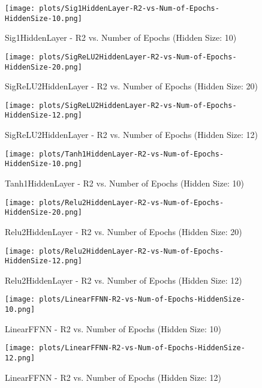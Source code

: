 \begin{figure}[H]
    \centering
    \texttt{[image: plots/Sig1HiddenLayer-R2-vs-Num-of-Epochs-HiddenSize-10.png]}
    \caption{Sig1HiddenLayer - R2 vs. Number of Epochs (Hidden Size: 10)}
\end{figure}

\begin{figure}[H]
    \centering
    \texttt{[image: plots/SigReLU2HiddenLayer-R2-vs-Num-of-Epochs-HiddenSize-20.png]}
    \caption{SigReLU2HiddenLayer - R2 vs. Number of Epochs (Hidden Size: 20)}
\end{figure}

\begin{figure}[H]
    \centering
    \texttt{[image: plots/SigReLU2HiddenLayer-R2-vs-Num-of-Epochs-HiddenSize-12.png]}
    \caption{SigReLU2HiddenLayer - R2 vs. Number of Epochs (Hidden Size: 12)}
\end{figure}

\begin{figure}[H]
    \centering
    \texttt{[image: plots/Tanh1HiddenLayer-R2-vs-Num-of-Epochs-HiddenSize-10.png]}
    \caption{Tanh1HiddenLayer - R2 vs. Number of Epochs (Hidden Size: 10)}
\end{figure}

\begin{figure}[H]
    \centering
    \texttt{[image: plots/Relu2HiddenLayer-R2-vs-Num-of-Epochs-HiddenSize-20.png]}
    \caption{Relu2HiddenLayer - R2 vs. Number of Epochs (Hidden Size: 20)}
\end{figure}

\begin{figure}[H]
    \centering
    \texttt{[image: plots/Relu2HiddenLayer-R2-vs-Num-of-Epochs-HiddenSize-12.png]}
    \caption{Relu2HiddenLayer - R2 vs. Number of Epochs (Hidden Size: 12)}
\end{figure}

\begin{figure}[H]
    \centering
    \texttt{[image: plots/LinearFFNN-R2-vs-Num-of-Epochs-HiddenSize-10.png]}
    \caption{LinearFFNN - R2 vs. Number of Epochs (Hidden Size: 10)}
\end{figure}

\begin{figure}[H]
    \centering
    \texttt{[image: plots/LinearFFNN-R2-vs-Num-of-Epochs-HiddenSize-12.png]}
    \caption{LinearFFNN - R2 vs. Number of Epochs (Hidden Size: 12)}
\end{figure}

